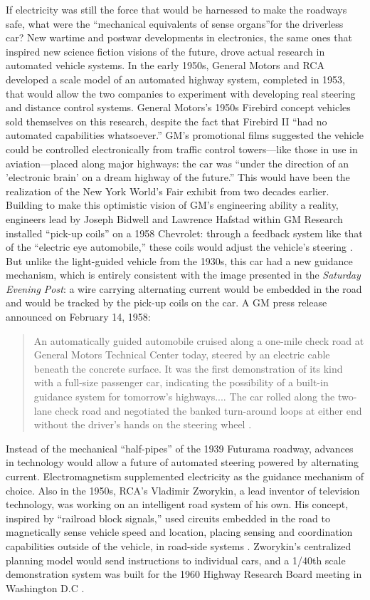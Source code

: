 If electricity was still the force that would be harnessed to make the
roadways safe, what were the ``mechanical equivalents of sense
organs''\cite{???-wiener}for the driverless car? New
wartime and postwar developments in electronics, the same ones that
inspired new science fiction visions of the future, drove actual
research in automated vehicle systems. In the early 1950s, General
Motors and RCA developed a scale model of an automated highway system,
completed in 1953, that would allow the two companies to experiment
with developing real steering and distance control systems.\cite{???}
General Motors's 1950s Firebird concept
vehicles sold themselves on this research, despite the fact that
Firebird II ``had no automated capabilities whatsoever.''\cite{???} GM's
promotional films suggested the vehicle could be controlled
electronically from traffic control towers---like those in use in
aviation---placed along major highways: the car was ``under the direction
of an 'electronic brain' on a dream highway of the future.''\cite{???} This
would have been the realization of the New York World's Fair exhibit
from two decades earlier. Building to make
this optimistic vision of GM's engineering ability a reality,
engineers lead by Joseph Bidwell and Lawrence Hafstad within GM
Research installed ``pick-up coils'' on a 1958 Chevrolet: through a
feedback system like that of the ``electric eye automobile,'' these
coils would adjust the vehicle's steering \cite{???}. But unlike the
light-guided vehicle from the 1930s, this car had a new guidance
mechanism, which is entirely consistent with the image presented in
the \emph{Saturday Evening Post}: a wire carrying alternating current would
be embedded in the road and would be tracked by the pick-up coils on
the car. A GM press release announced on February 14, 1958:
\begin{quote}
An automatically guided automobile cruised along a one-mile check road
at General Motors Technical Center today, steered by an electric cable
beneath the concrete surface. It was the first demonstration of its
kind with a full-size passenger car, indicating the possibility of a
built-in guidance system for tomorrow's highways.... The car rolled
along the two-lane check road and negotiated the banked turn-around
loops at either end without the driver's hands on the steering wheel \cite{???}.
\end{quote}

Instead of the mechanical ``half-pipes'' of the 1939 Futurama roadway, advances in
technology would allow a future of automated steering powered
by alternating current. Electromagnetism supplemented electricity as the
guidance mechanism of choice. Also in the 1950s, RCA's
Vladimir Zworykin, a lead inventor of television technology, was
working on an intelligent road system of his own. His concept,
inspired by ``railroad block signals,'' used circuits embedded in the
road to magnetically sense vehicle speed and location, placing sensing
and coordination capabilities outside of the vehicle, in road-side
systems \cite{???}. Zworykin's centralized planning model would send
instructions to individual cars, and a 1/40th scale demonstration
system was built for the 1960 Highway Research Board meeting in
Washington D.C \cite{???}.

